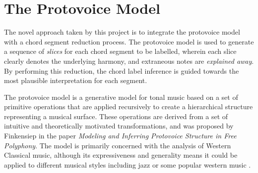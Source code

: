 \documentclass[12pt,a4paper,twoside,openany]{report} \usepackage[pdfborder={0 0 0}]{hyperref}    %
\theoremstyle{definition} \newtheorem{definition}{Definition}[section]
\begin{document}
\section{The Protovoice Model}
\label{sec:protovoiceModel}

The novel approach taken by this project is to integrate the protovoice model with a chord segment reduction process.
The protovoice model is used to generate a sequence of \textit{slices} for each chord segment to be labelled, wherein
each slice clearly denotes the underlying harmony, and extraneous notes are \textit{explained away}. 
By performing this reduction, the chord label inference is guided towards the most plausible interpretation for each segment. 


%
%
%

The protovoice model is a generative model for tonal music based on a set of primitive operations that are applied
recursively to create a hierarchical structure representing a musical surface. 
These operations are derived from a set of intuitive and theoretically motivated transformations, and was proposed by Finkensiep in the paper 
\textit{Modeling and Inferring Protovoice Structure in Free Polyphony}\cite{finkensiepModelingInferringProtovoice2021}.
The model is primarily concerned with the analysis of Western Classical music, although its expressiveness and generality means it could be applied to different musical styles including jazz or some popular western music \cite{finkensiepStructureFreePolyphony2023}. 
\end{document}
